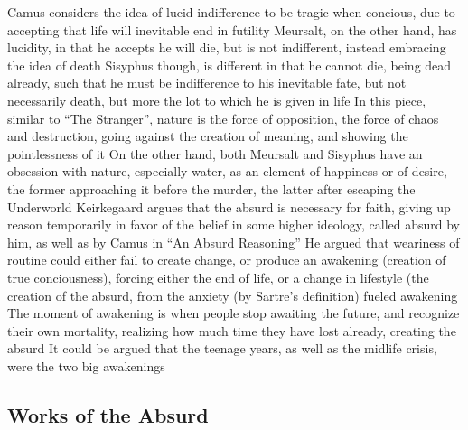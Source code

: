 \documentclass[11 pt, twoside]{article}
\newenvironment{outline*}
{
	\begin{outline}[enumerate]
	}
	{\end{outline}
}
\begin{document}
\begin{outline*}
\3 Camus considers the idea of lucid indifference to be tragic when concious, due to accepting that life will inevitable end in futility
\3 Meursalt, on the other hand, has lucidity, in that he accepts he will die, but is not indifferent, instead embracing the idea of death
\3 Sisyphus though, is different in that he cannot die, being dead already, such that he must be indifference to his inevitable fate, but not necessarily death, but more the lot to which he is given in life
\2 In this piece, similar to ``The Stranger'', nature is the force of opposition, the force of chaos and destruction, going against the creation of meaning, and showing the pointlessness of it
\3 On the other hand, both Meursalt and Sisyphus have an obsession with nature, especially water, as an element of happiness or of desire, the former approaching it before the murder, the latter after escaping the Underworld
\1 Keirkegaard argues that the absurd is necessary for faith, giving up reason temporarily in favor of the belief in some higher ideology, called absurd by him, as well as by Camus in ``An Absurd Reasoning''
\2 He argued that weariness of routine could either fail to create change, or produce an awakening (creation of true conciousness), forcing either the end of life, or a change in lifestyle (the creation of the absurd, from the anxiety (by Sartre's definition) fueled awakening
\3 The moment of awakening is when people stop awaiting the future, and recognize their own mortality, realizing how much time they have lost already, creating the absurd
\3 It could be argued that the teenage years, as well as the midlife crisis, were the two big awakenings
\end{outline*}
\subsection{Works of the Absurd}
\begin{outline*}
\end{outline*}
\end{document}
